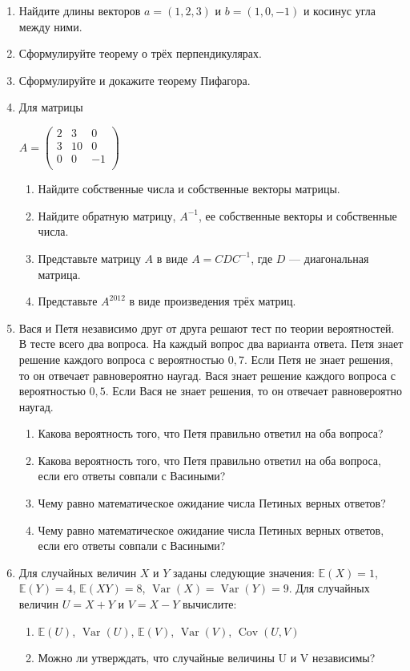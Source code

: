\documentclass[pdftex,12pt,a4paper]{article}
\DeclareMathOperator{\Var}{Var} %
\DeclareMathOperator{\Cov}{Cov} %
\newcommand{\E}{\mathbb{E}} %
\begin{document}
\begin{enumerate}
\item Найдите длины векторов $a=(1,2,3)$ и $b=(1,0,-1)$ и косинус угла между ними.
\item Сформулируйте теорему о трёх перпендикулярах.
\item Сформулируйте и докажите теорему Пифагора.
\item Для матрицы 

$A=\left(%
\begin{array}{ccc}
  2 & 3 & 0 \\
  3 & 10 & 0 \\
  0 & 0 & -1 \\
\end{array}%
\right)$ \\

\begin{enumerate}
\item Найдите собственные числа и собственные векторы матрицы.
\item Найдите обратную матрицу, $A^{-1}$, ее собственные векторы и собственные числа.
\item Представьте матрицу $A$ в виде $A=CDC^{-1}$, где $D$ --- диагональная матрица.
\item Представьте $A^{2012}$ в виде произведения трёх матриц.
\end{enumerate}

\item Вася и Петя независимо друг от друга решают тест по теории вероятностей. В тесте всего два вопроса. На каждый вопрос два варианта ответа. Петя знает решение каждого вопроса с вероятностью $0{,}7$. Если Петя не знает решения, то он отвечает равновероятно наугад. Вася знает решение каждого вопроса с вероятностью $0{,}5$. Если Вася не знает решения, то он отвечает равновероятно наугад.
\begin{enumerate}
\item Какова вероятность того, что Петя правильно ответил на оба вопроса?
\item Какова вероятность того, что Петя правильно ответил на оба вопроса, если его ответы совпали с Васиными?
\item Чему равно математическое ожидание числа Петиных верных ответов?
\item Чему равно математическое ожидание числа Петиных верных ответов, если его ответы совпали с Васиными?
\end{enumerate}

\item Для случайных величин $X$ и $Y$ заданы следующие значения: $\E(X)=1$, $\E(Y)=4$, $\E(XY)=8$, $\Var(X)=\Var(Y)=9$. Для случайных величин $U=X+Y$ и $V=X-Y$ вычислите: 
\begin{enumerate}
\item $\E(U)$, $\Var(U)$, $\E(V)$, $\Var(V)$, $\Cov(U,V)$ 
\item Можно ли утверждать, что случайные величины U и V независимы? 
\end{enumerate}


\end{enumerate}
\end{document}

